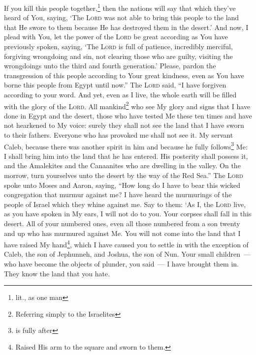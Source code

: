\begin{inparaenum}
     If you kill this people together,\footnote{lit., as one man} then the nations will say that which they've heard of You, saying,%
     `The \textsc{Lord} was not able to bring this people to the land that He swore to them because He has destroyed them in the desert.'%
     And now, I plead with You, let the power of the \textsc{Lord} be great according as You have previously spoken, saying,%
     `The \textsc{Lord} is full of patience, incredibly merciful, forgiving wrongdoing and sin, not clearing those who are guilty, visiting the wrongdoings unto the third and fourth generation.'%
     Please, pardon the transgression of this people according to Your great kindness, even as You have borne this people from Egypt until now.''%
     The \textsc{Lord} said, ``I have forgiven according to your word.%
     And yet, even as I live, the whole earth will be filled with the glory of the \textsc{Lord}.%
     All mankind\footnote{Referring simply to the Israelites} who see My glory and signs that I have done in Egypt and the desert, those who have tested Me these ten times and have not hearkened to My voice:%
     surely they shall not see the land that I have sworn to their fathers. Everyone who has provoked me shall not see it.%
     My servant Caleb, because there was another spirit in him and because he fully follows\footnote{is fully after} Me: I shall bring him into the land that he has entered. His posterity shall possess it,%
     and the Amalekites and the Canaanites who are dwelling in the valley. On the morrow, turn yourselves unto the desert by the way of the Red Sea.''%
     The \textsc{Lord} spoke unto Moses and Aaron, saying,%
     ``How long do I have to bear this wicked congregation that murmur against me? I have heard the murmurings of the people of Israel which they whine against me.%
     Say to them: `As I, the \textsc{Lord} live, as you have spoken in My ears, I will not do to you.%
     Your corpses shall fall in this desert. All of your numbered ones, even all those numbered from a son twenty and up who has murmured against Me.%
     You will not come into the land that I have raised My hand\footnote{Raised His arm to the square and sworn to them.}, which I have caused you to settle in with the exception of Caleb, the son of Jephunneh, and Joshua, the son of Nun.%
     Your small children~--- who have become the objects of plunder, you said~--- I have brought them in. They know the land that you hate.%

\end{inparaenum}
